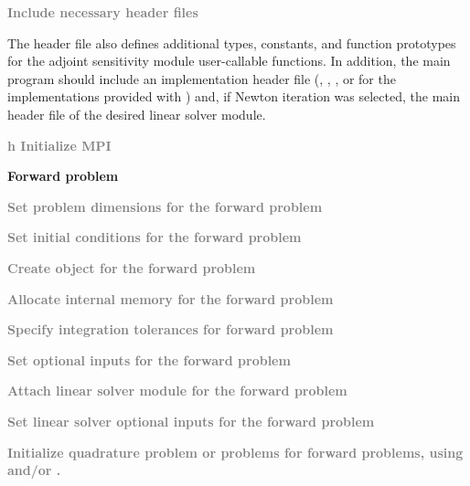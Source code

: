 \begin{Steps}

\item
  \textcolor{gray}{\bf Include necessary header files}
  
  The  header file also defines additional types, constants, and
  function prototypes for the adjoint sensitivity module user-callable functions.
  In addition, the main program should include an {\nvector} 
  implementation header file (,
  , , or 
  for the implementations provided with {\cvodes}) and, if Newton iteration 
  was selected, the main header file of the desired linear solver module.

\item
  \textcolor{gray}{\bf {\p} {h} Initialize MPI}

  \vspace{0.2in}\centerline{\bf Forward problem}

\item
  \textcolor{gray}{\bf Set problem dimensions for the forward problem}

\item
  \textcolor{gray}{\bf Set initial conditions for the forward problem}

\item
  \textcolor{gray}{\bf Create {\cvodes} object for the forward problem}

\item
  \textcolor{gray}{\bf Allocate internal memory for the forward problem}

\item
  \textcolor{gray}{\bf Specify integration tolerances for forward problem}

\item
  \textcolor{gray}{\bf Set optional inputs for the forward problem}

\item
  \textcolor{gray}{\bf Attach linear solver module for the forward problem}

\item
  \textcolor{gray}{\bf Set linear solver optional inputs for the forward problem}

\item
  \textcolor{gray}{\bf Initialize quadrature problem or problems for forward
    problems, using  and/or .}


\end{Steps}
